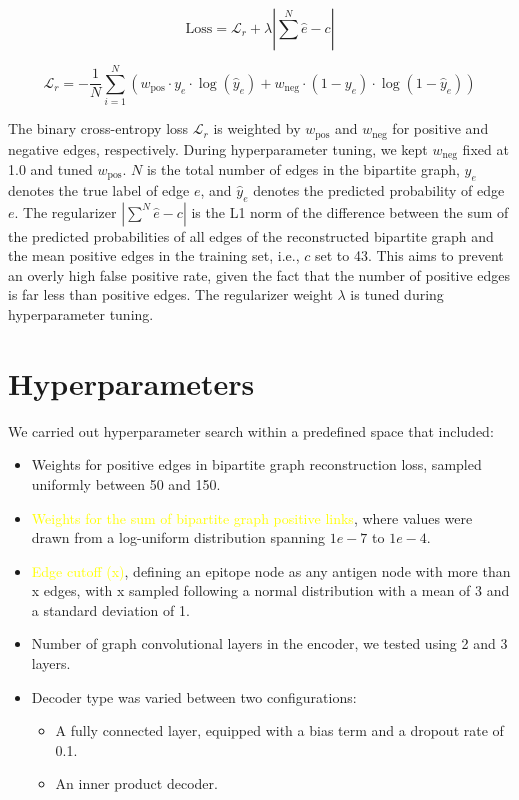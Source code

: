 \documentclass[11pt]{article}
\begin{document}
\begin{equation}
\text{Loss} = \mathcal{L}_r + \lambda \left| \sum^{N} \hat{e} - c \right|
\end{equation}

\begin{equation}
\mathcal{L}_r = -\frac{1}{N} \sum_{i=1}^{N} \left( w_{\text{pos}} \cdot y_e \cdot \log(\hat{y}_e) + w_{\text{neg}} \cdot (1 - y_e) \cdot \log(1 - \hat{y}_e) \right)
\end{equation}

The binary cross-entropy loss $\mathcal{L}_r$ is weighted by $w_{\text{pos}}$ and $w_{\text{neg}}$ for positive and negative edges, respectively. During hyperparameter tuning, we kept $w_{\text{neg}}$ fixed at 1.0 and tuned $w_{\text{pos}}$. $N$ is the total number of edges in the bipartite graph, $y_e$ denotes the true label of edge $e$, and $\hat{y}_e$ denotes the predicted probability of edge $e$. The regularizer $\left| \sum^{N} \hat{e} - c \right|$ is the L1 norm of the difference between the sum of the predicted probabilities of all edges of the reconstructed bipartite graph and the mean positive edges in the training set, i.e., $c$ set to 43. This aims to prevent an overly high false positive rate, given the fact that the number of positive edges is far less than positive edges. The regularizer weight $\lambda$ is tuned during hyperparameter tuning.

\section*{Hyperparameters}
We carried out hyperparameter search within a predefined space that included:

\begin{itemize}
    \item Weights for positive edges in bipartite graph reconstruction loss, sampled uniformly between 50 and 150.
    \item \textcolor{yellow}{Weights for the sum of bipartite graph positive links}, where values were drawn from a log-uniform distribution spanning $1e-7$ to $1e-4$.
    \item \textcolor{yellow}{Edge cutoff (x)}, defining an epitope node as any antigen node with more than x edges, with x sampled following a normal distribution with a mean of 3 and a standard deviation of 1.
    \item Number of graph convolutional layers in the encoder, we tested using 2 and 3 layers.
    \item Decoder type was varied between two configurations:
    \begin{itemize}
        \item A fully connected layer, equipped with a bias term and a dropout rate of 0.1.
        \item An inner product decoder.
    \end{itemize}
\end{itemize}
\end{document}
